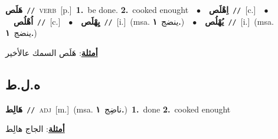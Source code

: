 \documentclass[10pt,a4paper,twoside]{article} %
\begin{document}
\begin{multicols}{2}
{\setlength\topsep{0pt}\textbf{\foreignlanguage{arabic}{هَلَص}}\ {\color{gray}\texttt{//}\color{black}}\ \textsc{verb}\ [p.]\ \textbf{1.}~be done.  \textbf{2.}~cooked enought\ \ $\bullet$\ \ \setlength\topsep{0pt}\textbf{\foreignlanguage{arabic}{اِهْلَص}}\ {\color{gray}\texttt{//}\color{black}}\ [c.]\ \ $\bullet$\ \ \setlength\topsep{0pt}\textbf{\foreignlanguage{arabic}{اُهْلُص}}\ {\color{gray}\texttt{//}\color{black}}\ [c.]\ \ $\bullet$\ \ \setlength\topsep{0pt}\textbf{\foreignlanguage{arabic}{يِهْلَص}}\ {\color{gray}\texttt{//}\color{black}}\ [i.]\ \color{gray}(msa. \foreignlanguage{arabic}{ينضج}~\foreignlanguage{arabic}{\textbf{١.}})\color{black}\ \ $\bullet$\ \ \setlength\topsep{0pt}\textbf{\foreignlanguage{arabic}{يُهْلُص}}\ {\color{gray}\texttt{//}\color{black}}\ [i.]\ \color{gray}(msa. \foreignlanguage{arabic}{ينضج}~\foreignlanguage{arabic}{\textbf{١.}})\color{black}\  \begin{flushright}\color{gray}\foreignlanguage{arabic}{\textbf{\underline{\foreignlanguage{arabic}{أمثلة}}}: هَلَص السمك عالأخير}\end{flushright}\color{black}} \vspace{2mm}

\vspace{-3mm}
\subsection*{\color{blue}\foreignlanguage{arabic}{ه.ل.ط}\color{blue}{}} 

{\setlength\topsep{0pt}\textbf{\foreignlanguage{arabic}{هَالِط}}\ {\color{gray}\texttt{//}\color{black}}\ \textsc{adj}\ [m.]\ \color{gray}(msa. \foreignlanguage{arabic}{ناضِج}~\foreignlanguage{arabic}{\textbf{١.}})\color{black}\ \textbf{1.}~done  \textbf{2.}~cooked enought\  \begin{flushright}\color{gray}\foreignlanguage{arabic}{\textbf{\underline{\foreignlanguage{arabic}{أمثلة}}}: الجاج هالِط}\end{flushright}\color{black}} \vspace{2mm}


\end{multicols}
\end{document}
